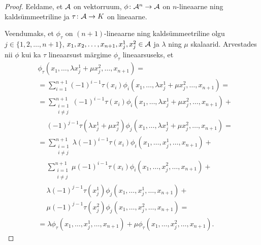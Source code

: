 \begin{proof}
    Eeldame, et $\mathcal{A}$ on vektorruum, $\phi \colon \mathcal{A}^n \to \mathcal{A}$ on
    $n$-lineaarne ning kaldsümmeetriline ja $\tau \colon \mathcal{A} \to K$
    on lineaarne.

    Veendumaks, et $\phi_\tau$ on $(n+1)$-lineaarne ning
    kaldsümmeetriline olgu $j \in \{1, 2, \dots, n+1\}$,
    $x_1, x_2, \dots, x_{n+1}, x_j^1, x_j^2 \in \mathcal{A}$ ja
    $\lambda$ ning $\mu$ skalaarid. Arvestades nii
    $\phi$ kui ka $\tau$ lineaarsust märgime $\phi_\tau$
    lineaarsuseks, et
    \begin{align*}
        &\phi_\tau(
            x_1, \dots, \lambda x_j^1 + \mu x_j^2, \dots, x_{n+1}
        ) = \\
        &= \sum_{i=1}^{n+1} (-1)^{i-1} \tau(x_i) \phi_i(
             x_1, \dots, \lambda x_j^1 + \mu x_j^2, \dots, x_{n+1}
           ) = \\
        &= \sum_{\substack{i=1 \\ i \ne j}}^{n+1} (-1)^{i-1}
           \tau(x_i) \phi_i(
             x_1, \dots, \lambda x_j^1 + \mu x_j^2, \dots, x_{n+1}
           ) + \\
        &\quad\ (-1)^{j-1} \tau(\lambda x_j^1 + \mu x_j^2)
           \phi_j(
             x_1, \dots, \lambda x_j^1 + \mu x_j^2, \dots, x_{n+1}
           ) = \\
        &= \sum_{\substack{i=1 \\ i \ne j}}^{n+1}
           \lambda (-1)^{i-1} \tau(x_i) \phi_i(
             x_1, \dots, x_j^1, \dots, x_{n+1}
           ) + \\
        &\quad\ \sum_{\substack{i=1 \\ i \ne j}}^{n+1} \mu
           (-1)^{i-1} \tau(x_i)
           \phi_i( x_1, \dots, x_j^2, \dots, x_{n+1} ) + \\
        &\quad\ \lambda (-1)^{j-1} \tau(x_j^1) \phi_j(
             x_1, \dots, x_j^1, \dots, x_{n+1}) + \\
        &\quad\ \mu (-1)^{j-1} \tau(x_j^2) \phi_j(
             x_1, \dots, x_j^2, \dots, x_{n+1}) = \\
        &= \lambda \phi_\tau(x_1, \dots, x_j^1, \dots, x_{n+1}) +
           \mu \phi_\tau(x_1, \dots, x_j^2, \dots, x_{n+1}).
    \end{align*}


\end{proof}
